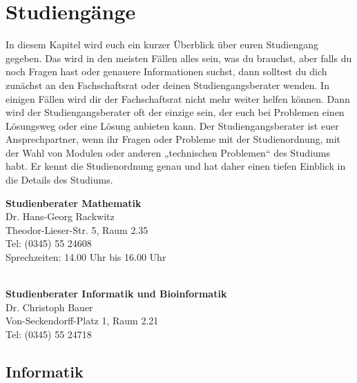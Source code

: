 
\section{Studiengänge}

In diesem Kapitel wird euch ein kurzer Überblick über euren Studiengang gegeben.
Das wird in den meisten Fällen alles sein, was du brauchst, aber falls du noch Fragen hast oder genauere Informationen suchst, dann solltest du dich zunächst an den Fachschaftsrat oder deinen Studiengangsberater wenden.
In einigen Fällen wird dir der Fachschaftsrat nicht mehr weiter helfen können.
Dann wird der Studiengangsberater oft der einzige sein, der euch bei Problemen einen Lösungsweg oder eine Lösung anbieten kann.
Der Studiengangsberater ist euer Ansprechpartner, wenn ihr Fragen oder Probleme mit der Studienordnung, mit der Wahl von Modulen oder anderen „technischen Problemen“ des Studiums habt.
Er kennt die Studienordnung genau und hat daher einen tiefen Einblick in die Details des Studiums.

\textbf{Studienberater Mathematik}\\
Dr. Hans-Georg Rackwitz\\
Theodor-Lieser-Str. 5, Raum 2.35\\
Tel: (0345) 55 24608\\
Sprechzeiten: 14.00 Uhr bis 16.00 Uhr\\
\\

\textbf{Studienberater Informatik und Bioinformatik}\\
Dr. Christoph Bauer\\
Von-Seckendorff-Platz 1, Raum 2.21\\
Tel: (0345) 55 24718\\



\subsection{Informatik}
\label{studiengang_informatik}
    
